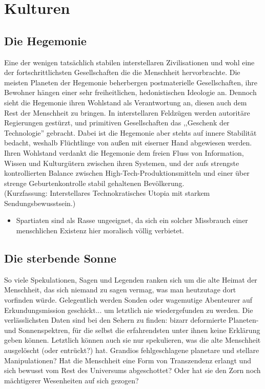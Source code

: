 \documentclass[10pt,a4paper]{report}
\begin{document}
\section{Kulturen}
\subsection*{Die Hegemonie}
Eine der wenigen tatsächlich stabilen interstellaren Zivilisationen und wohl eine der fortschrittlichsten Gesellschaften die die Menschheit hervorbrachte. Die meisten Planeten der Hegemonie beherbergen postmaterielle Gesellschaften, ihre Bewohner hängen einer sehr freiheitlichen, hedonistischen Ideologie an. Dennoch sieht die Hegemonie ihren Wohlstand als Verantwortung an, diesen auch dem Rest der Menschheit zu bringen. In interstellaren Feldzügen werden autoritäre Regierungen gestürzt, und primitiven Gesellschaften das ,,Geschenk der Technologie'' gebracht. Dabei ist die Hegemonie aber stehts auf innere Stabilität bedacht, weshalb Flüchtlinge von außen mit eiserner Hand abgewiesen werden.\\
Ihren Wohlstand verdankt die Hegemonie dem freien Fluss von Information, Wissen und Kulturgütern zwischen ihren Systemen, und der aufs strengste kontrollierten Balance zwischen High-Tech-Produktionsmitteln und einer über strenge Geburtenkontrolle stabil gehaltenen Bevölkerung.\\
(Kurzfassung: Interstellares Technokratisches Utopia mit starkem Sendungsbewusstsein.)
\begin{itemize}
\item Spartiaten sind als Rasse ungeeignet, da sich ein solcher Missbrauch einer menschlichen Existenz hier moralisch völlig verbietet.
\end{itemize}
\subsection*{Die sterbende Sonne}
So viele Spekulationen, Sagen und Legenden ranken sich um die alte Heimat der Menschheit, das sich niemand zu sagen vermag, was man heutzutage dort vorfinden würde. Gelegentlich werden Sonden oder wagemutige Abenteurer auf Erkundungsmission geschickt... um letztlich nie wiedergefunden zu werden. Die verlässlichsten Daten sind bei den Sehern zu finden: bizarr deformierte Planeten- und Sonnenspektren, für die selbst die erfahrendsten unter ihnen keine Erklärung geben können. Letztlich können auch sie nur spekulieren, was die alte Menschheit ausgelöscht (oder entrückt?) hat. Grandios fehlgeschlagene planetare und stellare Manipulationen? Hat die Menschheit eine Form von Transzendenz erlangt und sich bewusst vom Rest des Universums abge\-schottet? Oder hat sie den Zorn noch mächtigerer Wesenheiten auf sich gezogen?
\end{document}
